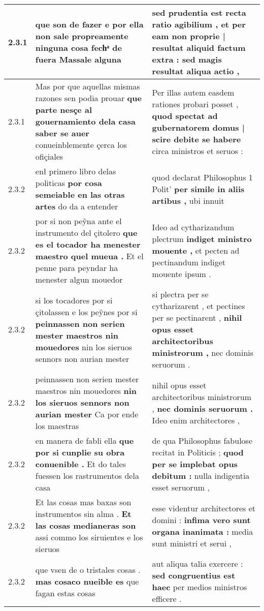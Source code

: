\begin{tabular}{|p{1cm}|p{6.5cm}|p{6.5cm}|}
2.3.1 & que son de fazer \textbf{ e por ella non sale propreamente ninguna cosa fechͣ de fuera } Massale alguna & sed prudentia est recta ratio agibilium , \textbf{ et per eam non proprie | resultat aliquid factum extra : } sed magis resultat aliqua actio , \\\hline
2.3.1 & Mas por que aquellas mismas razones sen podia prouar \textbf{ que parte nesçe al gouernamiento dela casa saber se auer } conueinblemente çerca los ofiçiales & Per illas autem easdem rationes probari posset , \textbf{ quod spectat ad gubernatorem domus | scire debite se habere } circa ministros et seruos : \\\hline
2.3.2 & enł primero libro delas politicas \textbf{ por cosa semeiable en las otras artes } do da a entender & quod declarat Philosophus 1 Polit’ \textbf{ per simile in aliis artibus , } ubi innuit \\\hline
2.3.2 & por si non peỹna ante el instrumento del çitolero \textbf{ que es el tocador ha menester maestro quel mueua . } Et el penne para peyndar ha menester algun mouedor & Ideo ad cytharizandum plectrum \textbf{ indiget ministro mouente , } et pecten ad pectinandum indiget mouente ipsum . \\\hline
2.3.2 & si los tocadores por si çitolassen e los peỹnes por si \textbf{ peinnassen non serien mester maestros nin mouedores } nin los sieruos sennors non aurian mester & si plectra per se cytharizarent , et pectines per se pectinarent , \textbf{ nihil opus esset architectoribus ministrorum , } nec dominis seruorum . \\\hline
2.3.2 & peinnassen non serien mester maestros nin mouedores \textbf{ nin los sieruos sennors non aurian mester } Ca por ende los maestras & nihil opus esset architectoribus ministrorum , \textbf{ nec dominis seruorum . } Ideo enim architectores , \\\hline
2.3.2 & en manera de fabli ella \textbf{ que por si cunplie su obra conuenible . } Et do tales fuessen los rastrumentos dela casa & de qua Philosophus fabulose recitat in Politicis ; \textbf{ quod per se implebat opus debitum : } nulla indigentia esset seruorum , \\\hline
2.3.2 & Et las cosas mas baxas son instrumentos sin alma . \textbf{ Et las cosas medianeras son } assi commo los siruientes e los sieruos & esse videntur architectores et domini : \textbf{ infima vero sunt organa inanimata : } media sunt ministri et serui , \\\hline
2.3.2 & que vsen de o tristales cosas . \textbf{ mas cosaco nueible es } que fagan estas cosas & aut aliqua talia exercere : \textbf{ sed congruentius est haec } per medios ministros efficere . \\\hline

\end{tabular}
